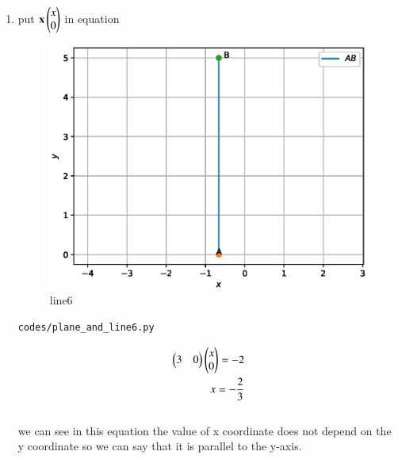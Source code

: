 \begin{enumerate}[label=\arabic*.,ref=\thesubsection.\theenumi]
\begin{enumerate}
\item put $\mathbf x \begin{pmatrix}x\\0\end{pmatrix}$ in equation
\begin{figure}[!ht]
	\centering
	\includegraphics[width=\columnwidth]{./figures/plane_and_line6.eps}
	\caption{line6 }
	\label{fig:line6}
\end{figure}
\begin{lstlisting}
codes/plane_and_line6.py
\end{lstlisting} 
\begin{align}
\begin{pmatrix}3 & 0\end{pmatrix}\begin{pmatrix}x\\0\end{pmatrix} = -2
\\
x= -\frac{2}{3}
\end{align}
\\
we can see in this equation the  value of x coordinate does not depend on the y coordinate so we can say that it is parallel to the y-axis.






\end{enumerate}
\end{enumerate}

